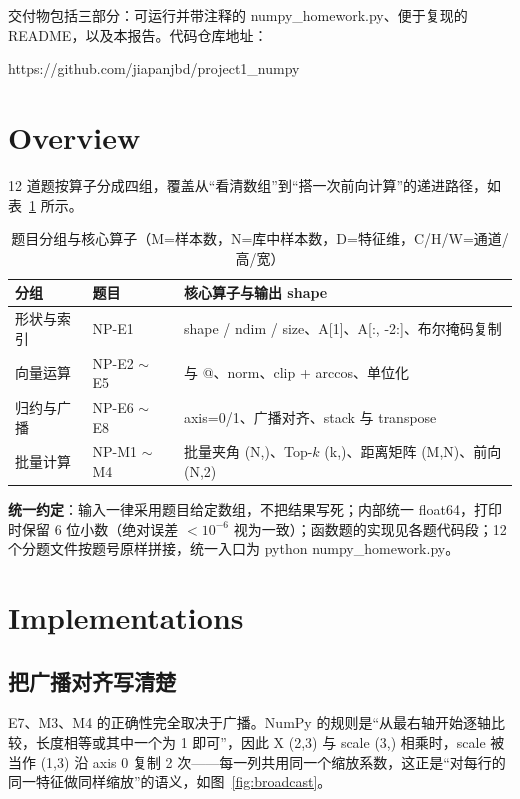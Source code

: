 \documentclass[a4paper,12pt]{article}
\newcommand{\code}[1]{{\ttfamily\footnotesize #1}}
\begin{document}
交付物包括三部分：可运行并带注释的 \code{numpy\_homework.py}、便于复现的 README，以及本报告。代码仓库地址：

\begin{center}
\code{https://github.com/jiapanjbd/project1\_numpy}
\end{center}

\section{Overview}

12 道题按算子分成四组，覆盖从“看清数组”到“搭一次前向计算”的递进路径，如表~\ref{tab:overview} 所示。

\begin{table}[H]
\centering
\small
\setlength{\tabcolsep}{4pt}
\caption{题目分组与核心算子（M=样本数，N=库中样本数，D=特征维，C/H/W=通道/高/宽）}
\label{tab:overview}
\begin{tabular}{@{}l l p{8.4cm}@{}}
\toprule
\textbf{分组} & \textbf{题目} & \textbf{核心算子与输出 shape} \\
\midrule
形状与索引 & NP-E1 & \code{shape / ndim / size}、\code{A[1]}、\code{A[:, -2:]}、布尔掩码复制 \\
向量运算 & NP-E2 $\sim$ E5 & \code{*} 与 \code{@}、\code{norm}、\code{clip + arccos}、单位化 \\
归约与广播 & NP-E6 $\sim$ E8 & \code{axis=0/1}、广播对齐、\code{stack} 与 \code{transpose} \\
批量计算 & NP-M1 $\sim$ M4 & 批量夹角 \code{(N,)}、Top-$k$ \code{(k,)}、距离矩阵 \code{(M,N)}、前向 \code{(N,2)} \\
\bottomrule
\end{tabular}
\end{table}

\textbf{统一约定}：输入一律采用题目给定数组，不把结果写死；内部统一 float64，打印时保留 6 位小数（绝对误差 $<10^{-6}$ 视为一致）；函数题的实现见各题代码段；12 个分题文件按题号原样拼接，统一入口为 \code{python numpy\_homework.py}。

\section{Implementations}

\subsection{把广播对齐写清楚}

E7、M3、M4 的正确性完全取决于广播。NumPy 的规则是“从最右轴开始逐轴比较，长度相等或其中一个为 1 即可”，因此 \code{X (2,3)} 与 \code{scale (3,)} 相乘时，\code{scale} 被当作 \code{(1,3)} 沿 axis 0 复制 2 次——每一列共用同一个缩放系数，这正是“对每行的同一特征做同样缩放”的语义，如图~\ref{fig:broadcast}。
\end{document}
